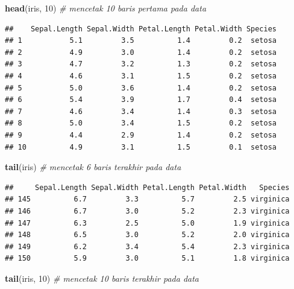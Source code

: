 \documentclass[]{article}
\newenvironment{Shaded}{\begin{snugshade}}{\end{snugshade}}
\newcommand{\CommentTok}[1]{\textcolor[rgb]{0.56,0.35,0.01}{\textit{#1}}}
\newcommand{\DecValTok}[1]{\textcolor[rgb]{0.00,0.00,0.81}{#1}}
\newcommand{\KeywordTok}[1]{\textcolor[rgb]{0.13,0.29,0.53}{\textbf{#1}}}
\newcommand{\NormalTok}[1]{#1}
\begin{document}
\begin{Shaded}
\begin{Highlighting}[]
\KeywordTok{head}\NormalTok{(iris, }\DecValTok{10}\NormalTok{) }\CommentTok{# mencetak 10 baris pertama pada data}
\end{Highlighting}
\end{Shaded}

\begin{verbatim}
##    Sepal.Length Sepal.Width Petal.Length Petal.Width Species
## 1           5.1         3.5          1.4         0.2  setosa
## 2           4.9         3.0          1.4         0.2  setosa
## 3           4.7         3.2          1.3         0.2  setosa
## 4           4.6         3.1          1.5         0.2  setosa
## 5           5.0         3.6          1.4         0.2  setosa
## 6           5.4         3.9          1.7         0.4  setosa
## 7           4.6         3.4          1.4         0.3  setosa
## 8           5.0         3.4          1.5         0.2  setosa
## 9           4.4         2.9          1.4         0.2  setosa
## 10          4.9         3.1          1.5         0.1  setosa
\end{verbatim}

\begin{Shaded}
\begin{Highlighting}[]
\KeywordTok{tail}\NormalTok{(iris) }\CommentTok{# mencetak 6 baris terakhir pada data}
\end{Highlighting}
\end{Shaded}

\begin{verbatim}
##     Sepal.Length Sepal.Width Petal.Length Petal.Width   Species
## 145          6.7         3.3          5.7         2.5 virginica
## 146          6.7         3.0          5.2         2.3 virginica
## 147          6.3         2.5          5.0         1.9 virginica
## 148          6.5         3.0          5.2         2.0 virginica
## 149          6.2         3.4          5.4         2.3 virginica
## 150          5.9         3.0          5.1         1.8 virginica
\end{verbatim}

\begin{Shaded}
\begin{Highlighting}[]
\KeywordTok{tail}\NormalTok{(iris, }\DecValTok{10}\NormalTok{) }\CommentTok{# mencetak 10 baris terakhir pada data}
\end{Highlighting}
\end{Shaded}
\end{document}
